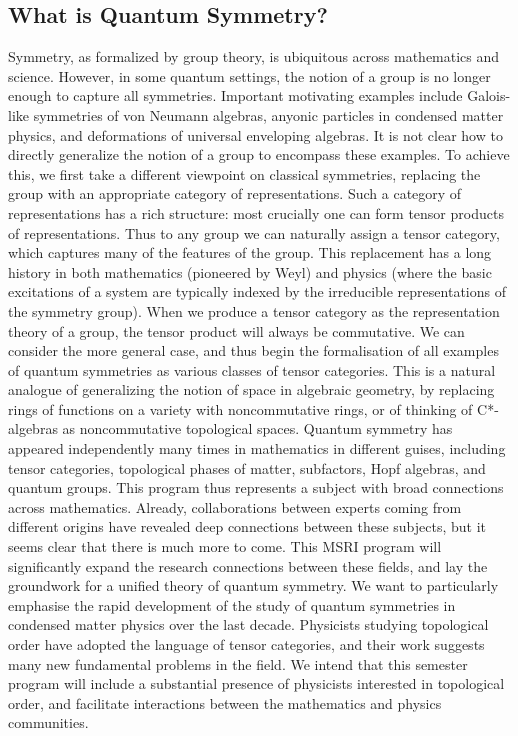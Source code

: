 \documentclass[11pt]{article}
\begin{document}
\subsection{What is Quantum Symmetry?}
Symmetry, as formalized by group theory, is ubiquitous across mathematics and science.  However, in some quantum settings, the notion of a group is no longer enough to capture all symmetries.  Important motivating examples include Galois-like symmetries of von Neumann algebras, anyonic particles in condensed matter physics, and deformations of universal enveloping algebras. 
It is not clear how to directly generalize the notion of a group to encompass these examples. To achieve this, we first take a different viewpoint on classical symmetries, replacing the group with an appropriate category of representations.  Such a category of representations has a rich structure: most crucially one can form tensor products of representations.  Thus to any group we can naturally assign a tensor category, which captures many of the features of the group. This replacement has a long history in both mathematics (pioneered by Weyl) and physics (where the basic excitations of a system are typically indexed by the irreducible representations of the symmetry group).
When we produce a tensor category as the representation theory of a group, the tensor product will always be commutative. We can consider the more general case, and thus begin the formalisation of all examples of quantum symmetries as various classes of tensor categories. This is a natural analogue of generalizing the notion of space in algebraic geometry, by replacing rings of functions on a variety with noncommutative rings, or of thinking of C*-algebras as noncommutative topological spaces.
Quantum symmetry has appeared independently many times in mathematics in different guises, including tensor categories, topological phases of matter, subfactors, Hopf algebras, and quantum groups. This program thus represents a subject with broad connections across mathematics. Already, collaborations between experts coming from different origins have revealed deep connections between these subjects, but it seems clear that there is much more to come. This MSRI program will significantly expand the research connections between these fields, and lay the groundwork for a unified theory of quantum symmetry.
We want to particularly emphasise the rapid development of the study of quantum symmetries in condensed matter physics over the last decade. Physicists studying topological order have adopted the language of tensor categories, and their work suggests many new fundamental problems in the field. We intend that this semester program will include a substantial presence of physicists interested in topological order, and facilitate interactions between the mathematics and physics communities.
\end{document}
